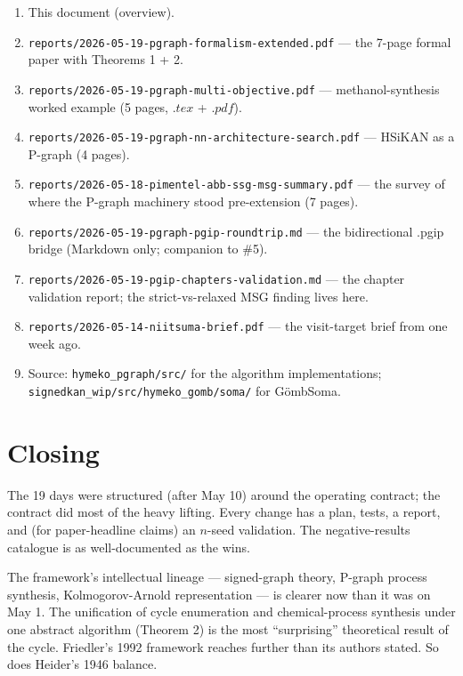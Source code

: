 \documentclass[11pt,a4paper]{article}
\theoremstyle{plain}
\theoremstyle{definition}
\newcommand{\code}[1]{\texttt{\small #1}}
\begin{document}
\begin{enumerate}
\item This document (overview).
\item \code{reports/2026-05-19-pgraph-formalism-extended.pdf} —
      the 7-page formal paper with Theorems 1 + 2.
\item \code{reports/2026-05-19-pgraph-multi-objective.pdf} —
      methanol-synthesis worked example (5 pages, $.tex$ + $.pdf$).
\item \code{reports/2026-05-19-pgraph-nn-architecture-search.pdf} —
      HSiKAN as a P-graph (4 pages).
\item \code{reports/2026-05-18-pimentel-abb-ssg-msg-summary.pdf} —
      the survey of where the P-graph machinery stood pre-extension
      (7 pages).
\item \code{reports/2026-05-19-pgraph-pgip-roundtrip.md} —
      the bidirectional .pgip bridge (Markdown only; companion to
      \#5).
\item \code{reports/2026-05-19-pgip-chapters-validation.md} —
      the chapter validation report; the strict-vs-relaxed MSG
      finding lives here.
\item \code{reports/2026-05-14-niitsuma-brief.pdf} —
      the visit-target brief from one week ago.
\item Source: \code{hymeko\_pgraph/src/} for the algorithm
      implementations; \code{signedkan\_wip/src/hymeko\_gomb/soma/}
      for GömbSoma.
\end{enumerate}

\section*{Closing}

The 19 days were structured (after May 10) around the operating
contract; the contract did most of the heavy lifting. Every change
has a plan, tests, a report, and (for paper-headline claims) an
$n$-seed validation. The negative-results catalogue is as
well-documented as the wins.

The framework's intellectual lineage — signed-graph theory,
P-graph process synthesis, Kolmogorov-Arnold representation — is
clearer now than it was on May 1. The unification of cycle
enumeration and chemical-process synthesis under one abstract
algorithm (Theorem 2) is the most ``surprising'' theoretical
result of the cycle. Friedler's 1992 framework reaches further
than its authors stated. So does Heider's 1946 balance.
\end{document}
